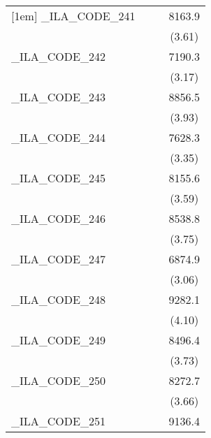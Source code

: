 {\begin{tabular}{l*{3}{c}}
[1em]
\_ILA\_CODE\_241&                     &                     &      8163.9\sym{***}\\
            &                     &                     &      (3.61)         \\
[1em]
\_ILA\_CODE\_242&                     &                     &      7190.3\sym{**} \\
            &                     &                     &      (3.17)         \\
[1em]
\_ILA\_CODE\_243&                     &                     &      8856.5\sym{***}\\
            &                     &                     &      (3.93)         \\
[1em]
\_ILA\_CODE\_244&                     &                     &      7628.3\sym{***}\\
            &                     &                     &      (3.35)         \\
[1em]
\_ILA\_CODE\_245&                     &                     &      8155.6\sym{***}\\
            &                     &                     &      (3.59)         \\
[1em]
\_ILA\_CODE\_246&                     &                     &      8538.8\sym{***}\\
            &                     &                     &      (3.75)         \\
[1em]
\_ILA\_CODE\_247&                     &                     &      6874.9\sym{**} \\
            &                     &                     &      (3.06)         \\
[1em]
\_ILA\_CODE\_248&                     &                     &      9282.1\sym{***}\\
            &                     &                     &      (4.10)         \\
[1em]
\_ILA\_CODE\_249&                     &                     &      8496.4\sym{***}\\
            &                     &                     &      (3.73)         \\
[1em]
\_ILA\_CODE\_250&                     &                     &      8272.7\sym{***}\\
            &                     &                     &      (3.66)         \\
[1em]
\_ILA\_CODE\_251&                     &                     &      9136.4\sym{***}\\

\end{tabular}}
